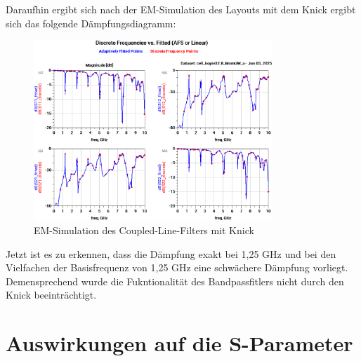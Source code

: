     Daraufhin ergibt sich nach der EM-Simulation des Layouts mit dem Knick ergibt sich das folgende Dämpfungsdiagramm:
    \begin{figure}[H]
        \centering
        \includegraphics[width=0.8\textwidth]{Pictures/EMSimulationmitKnick.png}
        \caption{EM-Simulation des Coupled-Line-Filters mit Knick}
    \end{figure}

    Jetzt ist es zu erkennen, dass die Dämpfung exakt bei 1,25 GHz und bei den Vielfachen der Basisfrequenz von 1,25 GHz eine schwächere Dämpfung vorliegt. Demensprechend wurde die Fukntionalität des Bandpassfitlers nicht durch den Knick beeinträchtigt.
\section{Auswirkungen auf die S-Parameter}
